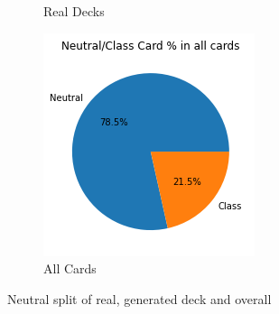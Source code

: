 \documentclass{report} %
\begin{document}
\begin{figure}[H]
\begin{subfigure}{.3\textwidth}
  \caption{Real Decks}
\end{subfigure}%
\begin{subfigure}{.3\textwidth}
  \centering
  \includegraphics[width=.75\linewidth]{TestImages/NeutralSplitAllCards}
  \caption{All Cards}
\end{subfigure}
\caption{Neutral split of real, generated deck and overall}
\end{figure}
\end{document}
